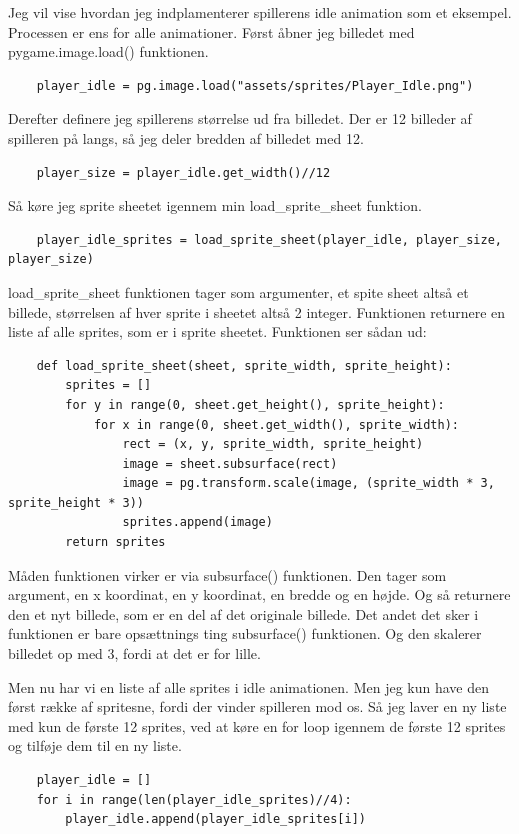 \documentclass{article}
\begin{document}
    Jeg vil vise hvordan jeg indplamenterer spillerens idle animation som et eksempel. 
    Processen er ens for alle animationer. Først åbner jeg billedet med pygame.image.load() funktionen.
    \begin{verbatim}
    player_idle = pg.image.load("assets/sprites/Player_Idle.png")
    \end{verbatim}

    Derefter definere jeg spillerens størrelse ud fra billedet. Der er 12 billeder af spilleren på langs, 
    så jeg deler bredden af billedet med 12.
    \begin{verbatim}
    player_size = player_idle.get_width()//12
    \end{verbatim}

    Så køre jeg sprite sheetet igennem min load\_sprite\_sheet funktion.
    \begin{verbatim}
    player_idle_sprites = load_sprite_sheet(player_idle, player_size, player_size)
    \end{verbatim}

    load\_sprite\_sheet funktionen tager som argumenter, et spite sheet altså et billede, 
    størrelsen af hver sprite i sheetet altså 2 integer.
    Funktionen returnere en liste af alle sprites, som er i sprite sheetet.
    Funktionen ser sådan ud:
    \begin{verbatim}
    def load_sprite_sheet(sheet, sprite_width, sprite_height):
        sprites = []
        for y in range(0, sheet.get_height(), sprite_height):
            for x in range(0, sheet.get_width(), sprite_width):
                rect = (x, y, sprite_width, sprite_height)
                image = sheet.subsurface(rect)
                image = pg.transform.scale(image, (sprite_width * 3, sprite_height * 3))
                sprites.append(image)
        return sprites
    \end{verbatim}

    Måden funktionen virker er via subsurface() funktionen. Den tager som argument, en x koordinat, en y koordinat, en bredde og en højde.
    Og så returnere den et nyt billede, som er en del af det originale billede. Det andet det sker i funktionen er bare opsættnings ting subsurface() funktionen.
    Og den skalerer billedet op med 3, fordi at det er for lille.

    Men nu har vi en liste af alle sprites i idle animationen. Men jeg kun have den først række af spritesne, 
    fordi der vinder spilleren mod os. Så jeg laver en ny liste med kun de første 12 sprites,
    ved at køre en for loop igennem de første 12 sprites og tilføje dem til en ny liste.
    \begin{verbatim}
    player_idle = []
    for i in range(len(player_idle_sprites)//4):
        player_idle.append(player_idle_sprites[i])    
    \end{verbatim}
\end{document}
